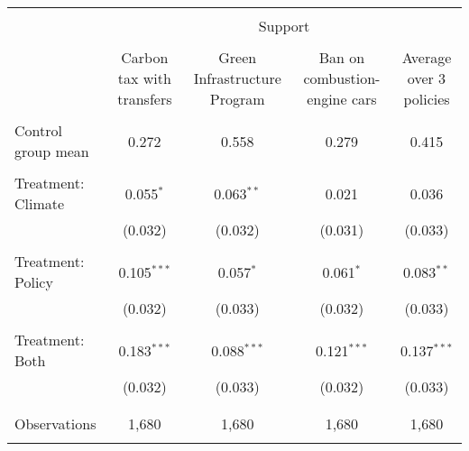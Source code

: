 
\begin{tabular}{@{\extracolsep{5pt}}lcccc} 
\\[-1.8ex]\hline 
\hline \\[-1.8ex] 
 & \multicolumn{4}{c}{Support} \\ 
\cline{2-5} 
\\[-1.8ex] & Carbon tax with transfers & Green Infrastructure Program & Ban on combustion-engine cars & Average over 3 policies \\ 
\hline \\[-1.8ex] 
 Control group mean & 0.272 & 0.558 & 0.279 & 0.415  \\ \hline \\[-1.8ex] Treatment: Climate & 0.055$^{*}$ & 0.063$^{**}$ & 0.021 & 0.036 \\ 
  & (0.032) & (0.032) & (0.031) & (0.033) \\ 
  & & & & \\ 
 Treatment: Policy & 0.105$^{***}$ & 0.057$^{*}$ & 0.061$^{*}$ & 0.083$^{**}$ \\ 
  & (0.032) & (0.033) & (0.032) & (0.033) \\ 
  & & & & \\ 
 Treatment: Both & 0.183$^{***}$ & 0.088$^{***}$ & 0.121$^{***}$ & 0.137$^{***}$ \\ 
  & (0.032) & (0.033) & (0.032) & (0.033) \\ 
  & & & & \\ 
\hline \\[-1.8ex] 

Observations & 1,680 & 1,680 & 1,680 & 1,680 \\ 
\hline 
\hline \\[-1.8ex] 
\end{tabular} 